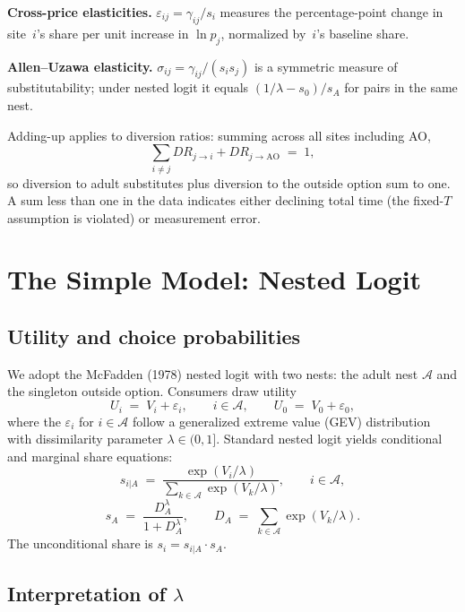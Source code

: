 \documentclass{article}
\begin{document}
\medskip\noindent\textbf{Cross-price elasticities.}  $\varepsilon_{ij} =
\gamma_{ij}/s_i$ measures the percentage-point change in site~$i$'s share per
unit increase in $\ln p_j$, normalized by~$i$'s baseline share.

\medskip\noindent\textbf{Allen--Uzawa elasticity.}  $\sigma_{ij} = \gamma_{ij}/
(s_i s_j)$ is a symmetric measure of substitutability; under nested logit it
equals $(1/\lambda - s_0)/s_A$ for pairs in the same nest.

\medskip\noindent Adding-up applies to diversion ratios: summing across all
sites including AO,
\[
  \sum_{i \neq j} DR_{j \to i} + DR_{j \to \mathrm{AO}} \;=\; 1,
\]
so diversion to adult substitutes plus diversion to the outside option sum to
one.  A sum less than one in the data indicates either declining total time
(the fixed-$T$ assumption is violated) or measurement error.

\bigskip

\section{The Simple Model: Nested Logit}

\subsection{Utility and choice probabilities}

We adopt the McFadden (1978) nested logit with two nests: the adult nest
$\mathcal{A}$ and the singleton outside option.  Consumers draw utility
\[
  U_i \;=\; V_i + \varepsilon_i, \qquad i \in \mathcal{A},
  \qquad U_0 \;=\; V_0 + \varepsilon_0,
\]
where the $\varepsilon_i$ for $i \in \mathcal{A}$ follow a generalized extreme
value (GEV) distribution with dissimilarity parameter $\lambda \in (0,1]$.
Standard nested logit yields conditional and marginal share equations:
\begin{equation}\label{eq:within}
  s_{i|A} \;=\; \frac{\exp(V_i/\lambda)}{\displaystyle\sum_{k \in \mathcal{A}}
    \exp(V_k/\lambda)},
  \qquad i \in \mathcal{A},
\end{equation}
\begin{equation}\label{eq:across}
  s_A \;=\; \frac{D_A^\lambda}{1 + D_A^\lambda},
  \qquad
  D_A \;=\; \sum_{k \in \mathcal{A}} \exp(V_k/\lambda).
\end{equation}
The unconditional share is $s_i = s_{i|A} \cdot s_A$.

\subsection{Interpretation of $\lambda$}
\end{document}
